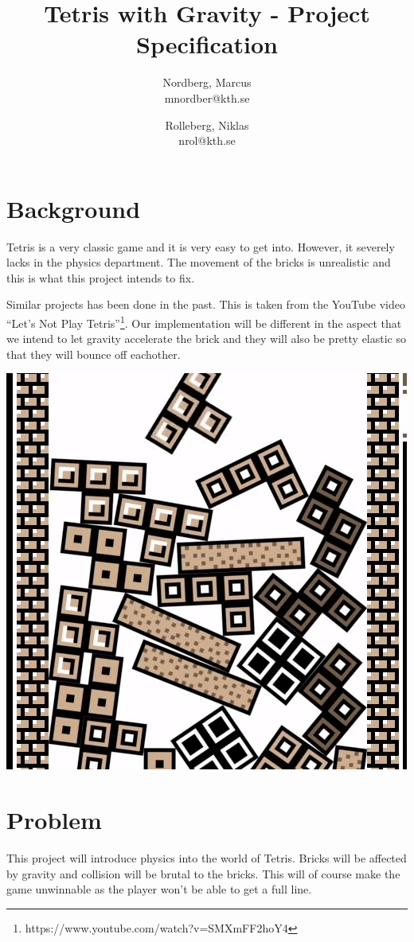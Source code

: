 \documentclass[11pt]{article} %
\title{Tetris with Gravity - Project Specification}
\author{Nordberg, Marcus \\ mnordber@kth.se
		\and
	Rolleberg, Niklas \\ nrol@kth.se}
\begin{document}
\maketitle

\section{Background}
Tetris is a very classic game and it is very easy to get into. However, it severely lacks in the physics department. The movement of the bricks is unrealistic and this is what this project intends to fix.

Similar projects has been done in the past. This is taken from the YouTube video ``Let's Not Play Tetris''\footnote{https://www.youtube.com/watch?v=SMXmFF2hoY4}. Our implementation will be different in the aspect that we intend to let gravity accelerate the brick and they will also be pretty elastic so that they will bounce off eachother.
\begin{center}
\includegraphics[scale=0.5]{tetris-gravity}
\end{center}

\section{Problem}
This project will introduce physics into the world of Tetris. Bricks will be affected by gravity and collision will be brutal to the bricks. This will of course make the game unwinnable as the player won't be able to get a full line.
\end{document}
